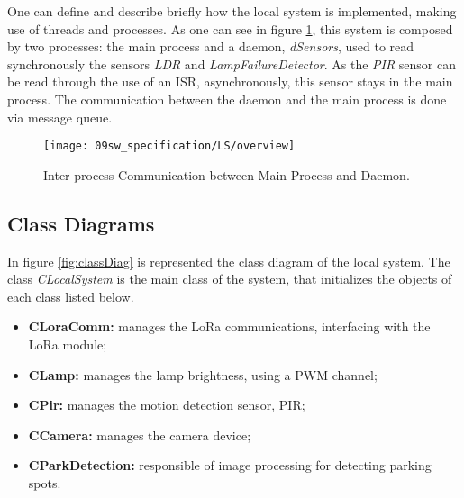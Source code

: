 One can define and describe briefly how the local system is implemented, making use of threads and processes. As one can see in figure \ref{fig:task_overview}, this system is composed by two processes: the main process and a daemon, \textit{dSensors}, used to read synchronously the sensors \textit{LDR} and \textit{LampFailureDetector}. As the \textit{PIR} sensor can be read through the use of an ISR, asynchronously, this sensor stays in the main process. The communication between the daemon and the main process is done via message queue.

\begin{figure}[H]
	\centering
	\texttt{[image: 09sw\_specification/LS/overview]}
	\caption{Inter-process Communication between Main Process and Daemon.}
	\label{fig:task_overview}
\end{figure}

\subsection{Class Diagrams}
In figure \ref{fig:classDiag} is represented the class diagram of the local system. The class \textit{CLocalSystem} is the main class of the system, that initializes the objects of each class listed below.

\begin{itemize}
	\item \textbf{CLoraComm:} manages the LoRa communications, interfacing with the LoRa module;
	\item \textbf{CLamp:} manages the lamp brightness, using a PWM channel;	
	\item \textbf{CPir:} manages the motion detection sensor, PIR;
	\item \textbf{CCamera:} manages the camera device;
	\item \textbf{CParkDetection:} responsible of image processing for detecting parking spots.
\end{itemize}

